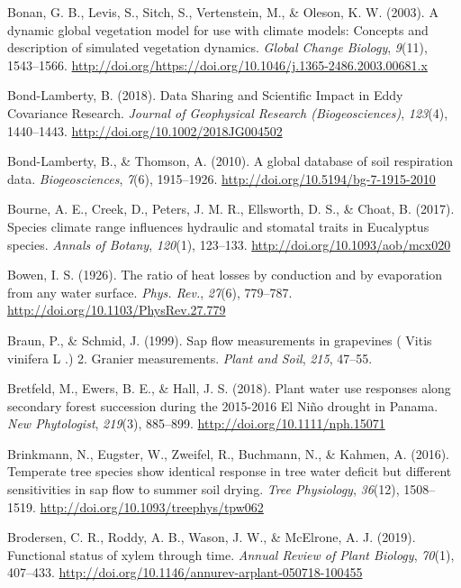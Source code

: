 \documentclass[11pt,twoside]{reedthesis}
\begin{document}
\hypertarget{ref-Bonan2003}{}
Bonan, G. B., Levis, S., Sitch, S., Vertenstein, M., \& Oleson, K. W.
(2003). A dynamic global vegetation model for use with climate models:
Concepts and description of simulated vegetation dynamics. \emph{Global
Change Biology}, \emph{9}(11), 1543--1566.
\url{http://doi.org/https://doi.org/10.1046/j.1365-2486.2003.00681.x}

\hypertarget{ref-Bond-Lamberty2018}{}
Bond-Lamberty, B. (2018). Data Sharing and Scientific Impact in Eddy
Covariance Research. \emph{Journal of Geophysical Research
(Biogeosciences)}, \emph{123}(4), 1440--1443.
\url{http://doi.org/10.1002/2018JG004502}

\hypertarget{ref-Bond-Lamberty2010}{}
Bond-Lamberty, B., \& Thomson, A. (2010). A global database of soil
respiration data. \emph{Biogeosciences}, \emph{7}(6), 1915--1926.
\url{http://doi.org/10.5194/bg-7-1915-2010}

\hypertarget{ref-bourne_species_2017}{}
Bourne, A. E., Creek, D., Peters, J. M. R., Ellsworth, D. S., \& Choat,
B. (2017). Species climate range influences hydraulic and stomatal
traits in Eucalyptus species. \emph{Annals of Botany}, \emph{120}(1),
123--133. \url{http://doi.org/10.1093/aob/mcx020}

\hypertarget{ref-Bowen1926}{}
Bowen, I. S. (1926). The ratio of heat losses by conduction and by
evaporation from any water surface. \emph{Phys. Rev.}, \emph{27}(6),
779--787. \url{http://doi.org/10.1103/PhysRev.27.779}

\hypertarget{ref-Braun1999}{}
Braun, P., \& Schmid, J. (1999). Sap flow measurements in grapevines (
Vitis vinifera L .) 2. Granier measurements. \emph{Plant and Soil},
\emph{215}, 47--55.

\hypertarget{ref-bretfeld_plant_2018}{}
Bretfeld, M., Ewers, B. E., \& Hall, J. S. (2018). Plant water use
responses along secondary forest succession during the 2015-2016 El Niño
drought in Panama. \emph{New Phytologist}, \emph{219}(3), 885--899.
\url{http://doi.org/10.1111/nph.15071}

\hypertarget{ref-Brinkmann2016}{}
Brinkmann, N., Eugster, W., Zweifel, R., Buchmann, N., \& Kahmen, A.
(2016). Temperate tree species show identical response in tree water
deficit but different sensitivities in sap flow to summer soil drying.
\emph{Tree Physiology}, \emph{36}(12), 1508--1519.
\url{http://doi.org/10.1093/treephys/tpw062}

\hypertarget{ref-Brodersen2019}{}
Brodersen, C. R., Roddy, A. B., Wason, J. W., \& McElrone, A. J. (2019).
Functional status of xylem through time. \emph{Annual Review of Plant
Biology}, \emph{70}(1), 407--433.
\url{http://doi.org/10.1146/annurev-arplant-050718-100455}
\end{document}
